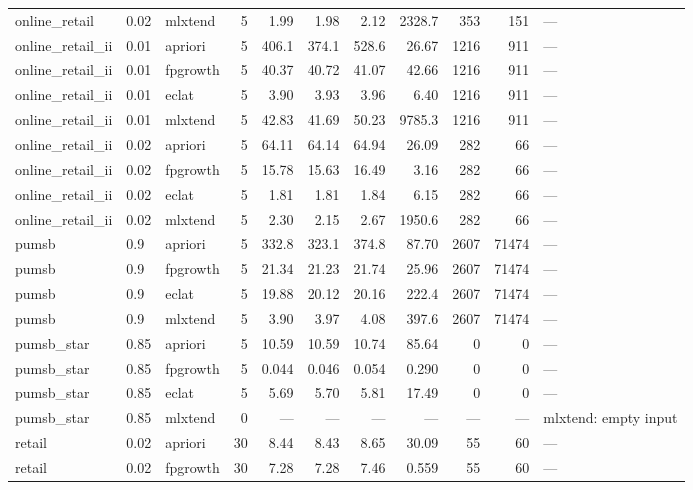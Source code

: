 \documentclass[journal,a4paper]{IEEEtran}
\begin{document}
\begin{longtable}{p{3.0cm}llrrrrrrrp{2.4cm}}
online\_\allowbreak{}retail & 0.02 & mlxtend & 5 & 1.99 & 1.98 & 2.12 & 2328.7 & 353 & 151 & --- \\
online\_\allowbreak{}retail\_\allowbreak{}ii & 0.01 & apriori & 5 & 406.1 & 374.1 & 528.6 & 26.67 & 1216 & 911 & --- \\
online\_\allowbreak{}retail\_\allowbreak{}ii & 0.01 & fpgrowth & 5 & 40.37 & 40.72 & 41.07 & 42.66 & 1216 & 911 & --- \\
online\_\allowbreak{}retail\_\allowbreak{}ii & 0.01 & eclat & 5 & 3.90 & 3.93 & 3.96 & 6.40 & 1216 & 911 & --- \\
online\_\allowbreak{}retail\_\allowbreak{}ii & 0.01 & mlxtend & 5 & 42.83 & 41.69 & 50.23 & 9785.3 & 1216 & 911 & --- \\
online\_\allowbreak{}retail\_\allowbreak{}ii & 0.02 & apriori & 5 & 64.11 & 64.14 & 64.94 & 26.09 & 282 & 66 & --- \\
online\_\allowbreak{}retail\_\allowbreak{}ii & 0.02 & fpgrowth & 5 & 15.78 & 15.63 & 16.49 & 3.16 & 282 & 66 & --- \\
online\_\allowbreak{}retail\_\allowbreak{}ii & 0.02 & eclat & 5 & 1.81 & 1.81 & 1.84 & 6.15 & 282 & 66 & --- \\
online\_\allowbreak{}retail\_\allowbreak{}ii & 0.02 & mlxtend & 5 & 2.30 & 2.15 & 2.67 & 1950.6 & 282 & 66 & --- \\
pumsb & 0.9 & apriori & 5 & 332.8 & 323.1 & 374.8 & 87.70 & 2607 & 71474 & --- \\
pumsb & 0.9 & fpgrowth & 5 & 21.34 & 21.23 & 21.74 & 25.96 & 2607 & 71474 & --- \\
pumsb & 0.9 & eclat & 5 & 19.88 & 20.12 & 20.16 & 222.4 & 2607 & 71474 & --- \\
pumsb & 0.9 & mlxtend & 5 & 3.90 & 3.97 & 4.08 & 397.6 & 2607 & 71474 & --- \\
pumsb\_\allowbreak{}star & 0.85 & apriori & 5 & 10.59 & 10.59 & 10.74 & 85.64 & 0 & 0 & --- \\
pumsb\_\allowbreak{}star & 0.85 & fpgrowth & 5 & 0.044 & 0.046 & 0.054 & 0.290 & 0 & 0 & --- \\
pumsb\_\allowbreak{}star & 0.85 & eclat & 5 & 5.69 & 5.70 & 5.81 & 17.49 & 0 & 0 & --- \\
pumsb\_\allowbreak{}star & 0.85 & mlxtend & 0 & --- & --- & --- & --- & --- & --- & mlxtend: empty input \\
retail & 0.02 & apriori & 30 & 8.44 & 8.43 & 8.65 & 30.09 & 55 & 60 & --- \\
retail & 0.02 & fpgrowth & 30 & 7.28 & 7.28 & 7.46 & 0.559 & 55 & 60 & --- \\

\end{longtable}
\end{document}
